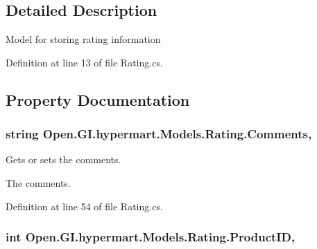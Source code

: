 \subsection{Detailed Description}
Model for storing rating information 



Definition at line 13 of file Rating.\+cs.



\subsection{Property Documentation}
\hypertarget{class_open_1_1_g_i_1_1hypermart_1_1_models_1_1_rating_a1b1467d2d1898f6109cc19ec24ee7fd4}{}
\subsubsection[{Comments}]{\setlength{\rightskip}{0pt plus 5cm}string Open.\+G\+I.\+hypermart.\+Models.\+Rating.\+Comments\hspace{0.3cm}{\ttfamily [get]}, {\ttfamily [set]}}\label{class_open_1_1_g_i_1_1hypermart_1_1_models_1_1_rating_a1b1467d2d1898f6109cc19ec24ee7fd4}


Gets or sets the comments. 

The comments. 

Definition at line 54 of file Rating.\+cs.

\hypertarget{class_open_1_1_g_i_1_1hypermart_1_1_models_1_1_rating_a84ebcfe9c03b3ee3859323be1a9b02da}{}
\subsubsection[{Product\+I\+D}]{\setlength{\rightskip}{0pt plus 5cm}int Open.\+G\+I.\+hypermart.\+Models.\+Rating.\+Product\+I\+D\hspace{0.3cm}{\ttfamily [get]}, {\ttfamily [set]}}\label{class_open_1_1_g_i_1_1hypermart_1_1_models_1_1_rating_a84ebcfe9c03b3ee3859323be1a9b02da}


